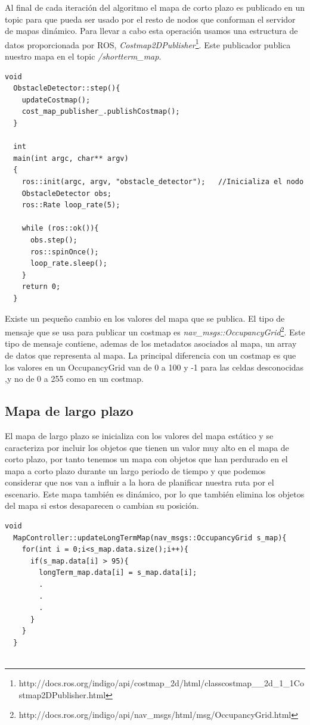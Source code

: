 Al final de cada iteración del algoritmo el mapa de corto plazo es publicado en un topic para que pueda ser usado por el resto de nodos que conforman el servidor de mapas dinámico. Para llevar a cabo esta operación usamos una estructura de datos proporcionada por ROS, \textit{Costmap2DPublisher}\footnote{http://docs.ros.org/indigo/api/costmap\_2d/html/classcostmap\_\_2d\_1\_1Costmap2DPublisher.html}. Este publicador publica nuestro mapa en el topic \textit{/shortterm\_map}.


\renewcommand{\lstlistingname}{Código}
\begin{lstlisting}[caption=Step del nodo obstacle\_detector, label={lst:stepobstacledetector}]
  void
  ObstacleDetector::step(){
    updateCostmap();
    cost_map_publisher_.publishCostmap();
  }

  int
  main(int argc, char** argv)
  {
    ros::init(argc, argv, "obstacle_detector");   //Inicializa el nodo
    ObstacleDetector obs;
    ros::Rate loop_rate(5);

    while (ros::ok()){
      obs.step();
      ros::spinOnce();
      loop_rate.sleep();
    }
    return 0;
  }

\end{lstlisting}

Existe un pequeño cambio en los valores del mapa que se publica. El tipo de mensaje que se usa para publicar un costmap es \textit{nav\_msgs::OccupancyGrid}\footnote{http://docs.ros.org/indigo/api/nav\_msgs/html/msg/OccupancyGrid.html}. Este tipo de mensaje contiene, ademas de los metadatos asociados al mapa, un array de datos que representa al mapa. La principal diferencia con un costmap es que los valores en un OccupancyGrid van de 0 a 100 y -1 para las celdas desconocidas ,y no de 0 a 255 como en un costmap.

\subsection{Mapa de largo plazo}
El mapa de largo plazo se inicializa con los valores del mapa estático y se caracteriza por incluir los objetos que tienen un valor muy alto en el mapa de corto plazo, por tanto tenemos un mapa con objetos que han perdurado en el mapa a corto plazo durante un largo periodo de tiempo y que podemos considerar que nos van a influir a la hora de planificar nuestra ruta por el escenario. 
Este mapa también es dinámico, por lo que también elimina los objetos del mapa si estos desaparecen o cambian su posición.


\begin{lstlisting}[caption=Procedimiento para añadir un objeto al mapa de largo plazo, label={lst:addobjectlongmap}]
  void
  MapController::updateLongTermMap(nav_msgs::OccupancyGrid s_map){
    for(int i = 0;i<s_map.data.size();i++){
      if(s_map.data[i] > 95){
        longTerm_map.data[i] = s_map.data[i]; 
        .
        .
        .
      }
    }
  }


\end{lstlisting}

